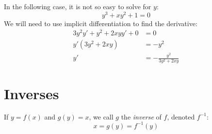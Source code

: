 \documentclass[../main.tex]{subfiles}
\begin{document}
\begin{exmp}
    In the following case, it is not so easy to solve for $y$:
    \[ y^3 +xy^2 + 1 = 0 \]
    We will need to use implicit differentiation to find the derivative:
    \begin{align*}
        3y^2y' + y^2 + 2xyy' + 0 &= 0\\
        y' \left( 3y^2 + 2xy \right) &= -y^2\\
        y' &= - \frac{y^2}{3y^2 + 2xy}
    \end{align*}
\end{exmp}
\section{Inverses}
If $y = f(x)$ and $g(y) = x$, we call $g$ the \emph{inverse} of $f$, 
denoted $f^{-1}$:
\[ x = g(y) = f^{-1}(y) \]
\end{document}
